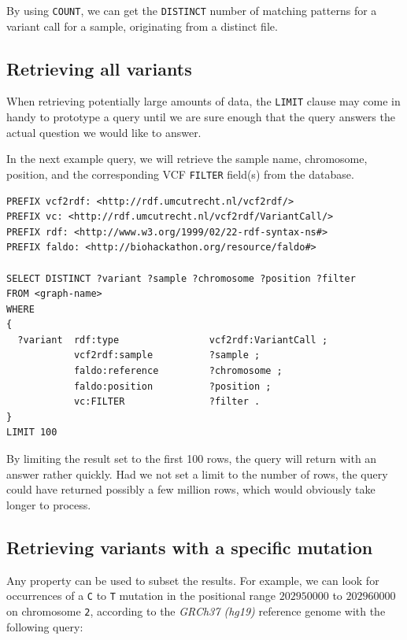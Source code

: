 \documentclass[11pt,a4paper,oneside]{book}
\begin{document}
  By using \texttt{COUNT}, we can get the \texttt{DISTINCT} number of
  matching patterns for a variant call for a sample, originating from
  a distinct file.

\subsection{Retrieving all variants}

  When retrieving potentially large amounts of data, the \texttt{LIMIT}
  clause may come in handy to prototype a query until we are sure enough
  that the query answers the actual question we would like to answer.

  In the next example query, we will retrieve the sample name,
  chromosome, position, and the corresponding VCF \texttt{FILTER} field(s)
  from the database.

\begin{siderules}
\begin{verbatim}
PREFIX vcf2rdf: <http://rdf.umcutrecht.nl/vcf2rdf/>
PREFIX vc: <http://rdf.umcutrecht.nl/vcf2rdf/VariantCall/>
PREFIX rdf: <http://www.w3.org/1999/02/22-rdf-syntax-ns#>
PREFIX faldo: <http://biohackathon.org/resource/faldo#>

SELECT DISTINCT ?variant ?sample ?chromosome ?position ?filter
FROM <graph-name>
WHERE
{
  ?variant  rdf:type                vcf2rdf:VariantCall ;
            vcf2rdf:sample          ?sample ;
            faldo:reference         ?chromosome ;
            faldo:position          ?position ;
            vc:FILTER               ?filter .
}
LIMIT 100
\end{verbatim}
\end{siderules}

  By limiting the result set to the first 100 rows, the query will return
  with an answer rather quickly.  Had we not set a limit to the number of
  rows, the query could have returned possibly a few million rows, which
  would obviously take longer to process.

\subsection{Retrieving variants with a specific mutation}

  Any property can be used to subset the results.  For example, we can
  look for occurrences of a \texttt{C} to \texttt{T} mutation in the positional
  range $202950000$ to $202960000$ on chromosome \texttt{2}, according to the
  \emph{GRCh37 (hg19)} reference genome with the following query:
\end{document}
